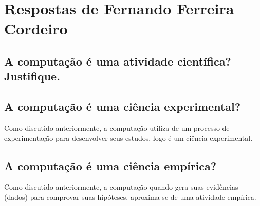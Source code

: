 \section{Respostas de Fernando Ferreira Cordeiro\label{tarefa-jhcf-componentes-eperimento}}


\subsection{A computação é uma atividade científica? Justifique.
}




\subsection{A computação é uma ciência experimental?}

Como discutido anteriormente, a computação utiliza de um processo de experimentação para desenvolver seus estudos, logo é um ciência experimental.

\subsection{A computação é uma ciência empírica?}

Como discutido anteriormente, a computação quando gera suas evidências (dados) para comprovar suas hipóteses, aproxima-se de uma atividade empírica.